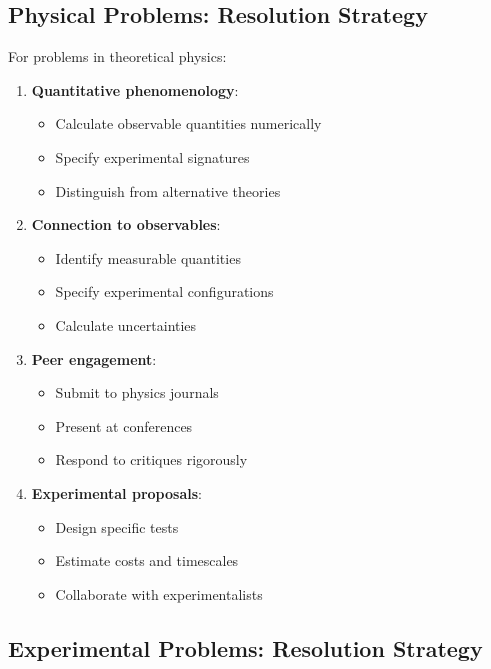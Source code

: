 \subsection{Physical Problems: Resolution Strategy}

For problems in theoretical physics:

\begin{enumerate}
    \item \textbf{Quantitative phenomenology}:
    \begin{itemize}
        \item Calculate observable quantities numerically
        \item Specify experimental signatures
        \item Distinguish from alternative theories
    \end{itemize}

    \item \textbf{Connection to observables}:
    \begin{itemize}
        \item Identify measurable quantities
        \item Specify experimental configurations
        \item Calculate uncertainties
    \end{itemize}

    \item \textbf{Peer engagement}:
    \begin{itemize}
        \item Submit to physics journals
        \item Present at conferences
        \item Respond to critiques rigorously
    \end{itemize}

    \item \textbf{Experimental proposals}:
    \begin{itemize}
        \item Design specific tests
        \item Estimate costs and timescales
        \item Collaborate with experimentalists
    \end{itemize}
\end{enumerate}

\subsection{Experimental Problems: Resolution Strategy}

